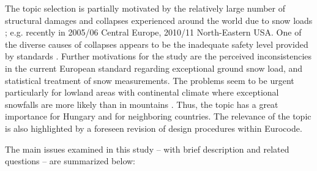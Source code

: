 The topic selection is partially motivated by the relatively large number of structural damages and collapses experienced around the world due to snow loads \citep{Geis2011}; e.g. recently in 2005/06 Central Europe, 2010/11 North-Eastern USA. One of the diverse causes of collapses appears to be the inadequate safety level provided by standards \citep{Holicky2009, Meloysund2010}. Further motivations for the study are the perceived inconsistencies in the current European standard regarding exceptional ground snow load, and statistical treatment of snow measurements. The problems seem to be urgent particularly for lowland areas with continental climate where exceptional snowfalls are more likely than in mountains \citep{Sanpaolesi1998}. Thus, the topic has a great importance for Hungary and for neighboring countries. The relevance of the topic is also highlighted by a foreseen revision of design procedures within Eurocode. 

The main issues examined in this study -- with brief description and related questions -- are summarized below:

